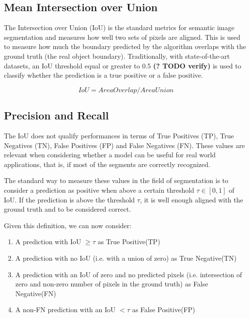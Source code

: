 \documentclass[english, bibtex]{kththesis}
\begin{document}
\subsection{Mean Intersection over Union}

The Intersection over Union (IoU) is the standard metrics for semantic image segmentation and measures how well two sets of pixels are aligned. This is used to measure how much the boundary predicted by the algorithm overlaps with the ground truth (the real object boundary). Traditionally, with state-of-the-art datasets, an IoU threshold equal or greater to 0.5 \textbf{(? TODO verify)} is used to classify whether the prediction is a true positive or a false positive.  

\begin{equation}
	IoU = Area Overlap / Area Union
  	\label{eqn:iou}
\end{equation}


\subsection{Precision and Recall}

The IoU does not qualify performances in terms of True Positives (TP), True Negatives (TN), False Positives (FP) and False Negatives (FN). These values are relevant when considering whether a model can be useful for real world applications, that is, if most of the segments are correctly recognized. 

The standard way to measure these values in the field of segmentation is to consider a prediction as positive when above a certain threshold $\tau \in [0,1]$ of IoU. If the prediction is above the threshold $\tau$, it is well enough aligned with the ground truth and to be considered correct. 

Given this definition, we can now consider:
\begin{enumerate}
\item A prediction with IoU $\geq \tau$ as True Positive(TP)
\item A prediction with no IoU (i.e. with a union of zero) as True Negative(TN)
\item A prediction with an IoU of zero and no predicted pixels (i.e. intersection of zero and non-zero number of pixels in the ground truth) as False Negative(FN)
\item A non-FN prediction with an IoU $< \tau$ as False Positive(FP)
\end{enumerate}
\end{document}
